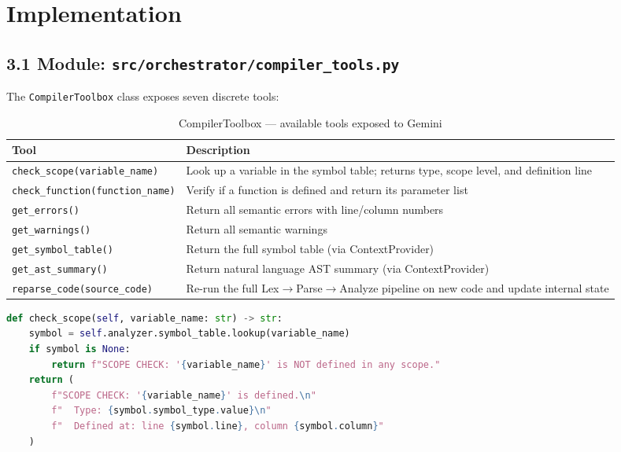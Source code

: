 \documentclass[a4paper,11pt]{article}
\begin{document}
\section{Implementation}

\subsection{3.1 Module: \texttt{src/orchestrator/compiler\_tools.py}}

The \texttt{CompilerToolbox} class exposes seven discrete tools:

\begin{table}[h]
\centering
\begin{tabularx}{\textwidth}{|l|X|}
\hline
\rowcolor{blue!10}
\textbf{Tool} & \textbf{Description} \\
\hline
\texttt{check\_scope(variable\_name)} & Look up a variable in the symbol table; returns type, scope level, and definition line \\
\hline
\texttt{check\_function(function\_name)} & Verify if a function is defined and return its parameter list \\
\hline
\texttt{get\_errors()} & Return all semantic errors with line/column numbers \\
\hline
\texttt{get\_warnings()} & Return all semantic warnings \\
\hline
\texttt{get\_symbol\_table()} & Return the full symbol table (via ContextProvider) \\
\hline
\texttt{get\_ast\_summary()} & Return natural language AST summary (via ContextProvider) \\
\hline
\texttt{reparse\_code(source\_code)} & Re-run the full Lex$\rightarrow$Parse$\rightarrow$Analyze pipeline on new code and update internal state \\
\hline
\end{tabularx}
\caption{CompilerToolbox --- available tools exposed to Gemini}
\end{table}

\begin{lstlisting}[language=Python, caption=CompilerToolbox example: check\_scope()]
def check_scope(self, variable_name: str) -> str:
    symbol = self.analyzer.symbol_table.lookup(variable_name)
    if symbol is None:
        return f"SCOPE CHECK: '{variable_name}' is NOT defined in any scope."
    return (
        f"SCOPE CHECK: '{variable_name}' is defined.\n"
        f"  Type: {symbol.symbol_type.value}\n"
        f"  Defined at: line {symbol.line}, column {symbol.column}"
    )
\end{lstlisting}
\end{document}
